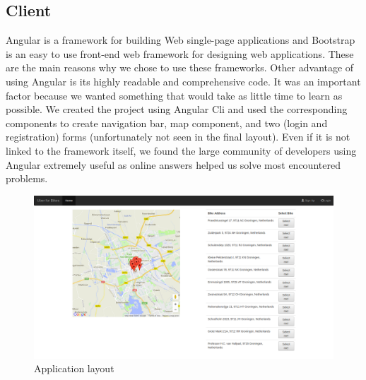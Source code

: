 \subsection{Client}
Angular is a framework for building Web single-page applications and Bootstrap is an easy to use front-end web framework for designing web applications. These are the main reasons why we chose to use these frameworks. Other advantage of using Angular is its highly readable and comprehensive code. It was an important factor because we wanted something that would take as little time to learn as possible. We created the project using Angular Cli and used the corresponding components to create navigation bar, map component, and two (login and registration) forms (unfortunately not seen in the final layout). Even if it is not linked to the framework itself, we found the large community of developers using Angular extremely useful as online answers helped us solve most encountered problems.

\begin{figure}[H]
		\centering
		\includegraphics[width=\textwidth]{images/screenshot.png}
		\caption{Application layout}
		\label{front-end}
	\end{figure}
